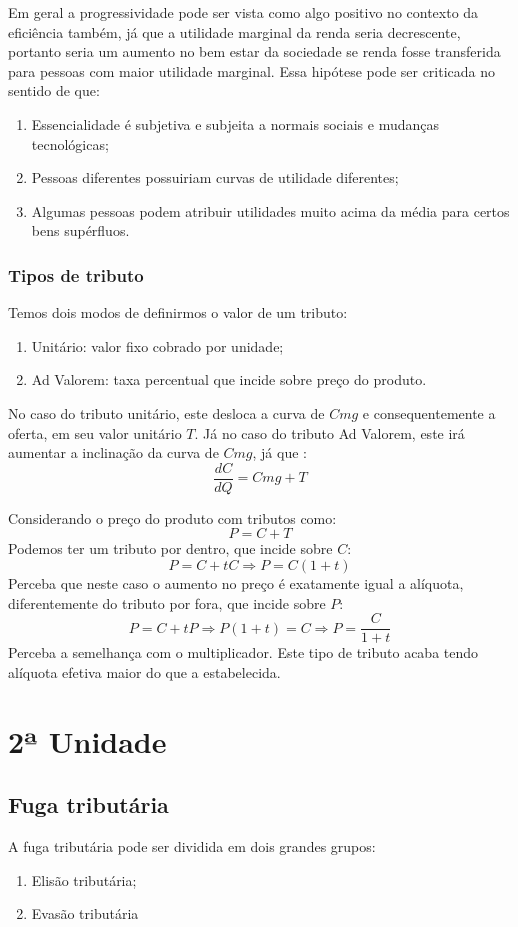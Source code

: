 \documentclass[12pt,a4paper,oneside,brazil]{abntex2}
\begin{document}
Em geral a progressividade pode ser vista como algo positivo no contexto da eficiência também, já que a utilidade marginal da renda seria decrescente, portanto seria um aumento no bem estar da sociedade se renda fosse transferida para pessoas com maior utilidade marginal. Essa hipótese pode ser criticada no sentido de que:
\begin{enumerate}
\item Essencialidade é subjetiva e subjeita a normais sociais e mudanças tecnológicas;
\item Pessoas diferentes possuiriam curvas de utilidade diferentes;
\item Algumas pessoas podem atribuir utilidades muito acima da média para certos bens supérfluos.
\end{enumerate}

\subsection{Tipos de tributo}
Temos dois modos de definirmos o valor de um tributo:
\begin{enumerate}
\item Unitário: valor fixo cobrado por unidade;
\item Ad Valorem: taxa percentual que incide sobre preço do produto.
\end{enumerate}

No caso do tributo unitário, este desloca a curva de $Cmg$ e consequentemente a oferta, em seu valor unitário $T$. Já no caso do tributo Ad Valorem, este irá aumentar a inclinação da curva de $Cmg$, já que :
\[ \frac{d C}{d Q} = Cmg + T \]

Considerando o preço do produto com tributos como:
\[ P = C + T\]
Podemos ter um tributo por dentro, que incide sobre $C$:
\[ P = C + t C \Rightarrow P = C ( 1 + t) \]
Perceba que neste caso o aumento no preço é exatamente igual a alíquota, diferentemente do tributo por fora, que incide sobre $P$:
\[ P = C + t P \Rightarrow P ( 1 + t ) = C \Rightarrow P = \frac{C}{1 + t}\]
Perceba a semelhança com o multiplicador. Este tipo de tributo acaba tendo alíquota efetiva maior do que a estabelecida. 

\chapter{2ª Unidade}

\section{Fuga tributária}
A fuga tributária pode ser dividida em dois grandes grupos:
\begin{enumerate}
  	\item Elisão tributária;
  	\item Evasão tributária 
\end{enumerate}  
\end{document}
